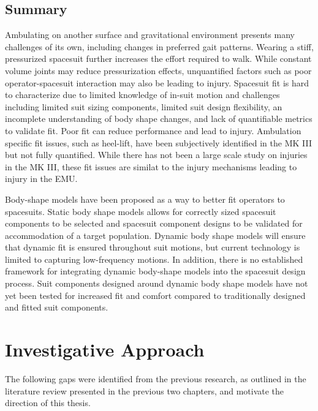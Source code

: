 \documentclass[defaultstyle,11pt]{comps}
\begin{document}
\hypertarget{summary-1}{%
\section{Summary}\label{summary-1}}

Ambulating on another surface and gravitational environment presents many challenges of its own, including changes in preferred gait patterns.
Wearing a stiff, pressurized spacesuit further increases the effort required to walk.
While constant volume joints may reduce pressurization effects, unquantified factors such as poor operator-spacesuit interaction may also be leading to injury.
Spacesuit fit is hard to characterize due to limited knowledge of in-suit motion and challenges including limited suit sizing components, limited suit design flexibility, an incomplete understanding of body shape changes, and lack of quantifiable metrics to validate fit.
Poor fit can reduce performance and lead to injury.
Ambulation specific fit issues, such as heel-lift, have been subjectively identified in the MK III but not fully quantified.
While there has not been a large scale study on injuries in the MK III, these fit issues are similat to the injury mechanisms leading to injury in the EMU.

Body-shape models have been proposed as a way to better fit operators to spacesuits.
Static body shape models allows for correctly sized spacesuit components to be selected and spacesuit component designs to be validated for accommodation of a target population.
Dynamic body shape models will ensure that dynamic fit is ensured throughout suit motions, but current technology is limited to capturing low-frequency motions.
In addition, there is no established framework for integrating dynamic body-shape models into the spacesuit design process.
Suit components designed around dynamic body shape models have not yet been tested for increased fit and comfort compared to traditionally designed and fitted suit components.

\hypertarget{investigative-approach}{%
\chapter{Investigative Approach}\label{investigative-approach}}

The following gaps were identified from the previous research, as outlined in the literature review presented in the previous two chapters, and motivate the direction of this thesis.
\end{document}
